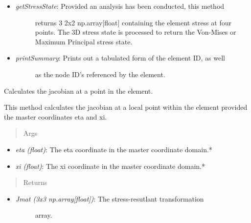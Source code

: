 \documentclass[letterpaper,10pt,english]{sphinxmanual}
\begin{document}
\begin{fulllineitems}
\begin{itemize}
\item {} \begin{description}
\item[{\emph{getStressState}: Provided an analysis has been conducted, this method}] \leavevmode
returns 3 2x2 np.array{[}float{]} containing the element stress at four
points. The 3D stress state is processed to return the Von-Mises
or Maximum Principal stress state.

\end{description}

\item {} \begin{description}
\item[{\emph{printSummary}: Prints out a tabulated form of the element ID, as well}] \leavevmode
as the node ID's referenced by the element.

\end{description}

\end{itemize}

\begin{fulllineitems}
\label{structures:AeroComBAT.Structures.CQUADX.J}
Calculates the jacobian at a point in the element.

This method calculates the jacobian at a local point within the element
provided the master coordinates eta and xi.
\begin{quote}\begin{description}
\item[{Args}] \leavevmode
\end{description}\end{quote}
\begin{itemize}
\item {} 
\emph{eta (float)}: The eta coordinate in the master coordinate domain.*

\item {} 
\emph{xi (float)}: The xi coordinate in the master coordinate domain.*

\end{itemize}
\begin{quote}\begin{description}
\item[{Returns}] \leavevmode
\end{description}\end{quote}
\begin{itemize}
\item {} \begin{description}
\item[{\emph{Jmat (3x3 np.array{[}float{]})}: The stress-resutlant transformation}] \leavevmode
array.


\end{description}
\end{itemize}
\end{fulllineitems}
\end{fulllineitems}
\end{document}
